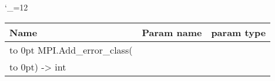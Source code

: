 \begingroup \catcode`\_=12 \tt
\begin{tabular}{lll}
\toprule
\textrm{Name}&\textrm{Param name}&\textrm{param type}\\
\midrule
\hbox to 0pt {MPI.Add_error_class(\hss}\\
\hbox to 0pt{) -> int\hss}\\
\bottomrule
\end{tabular}
\endgroup
